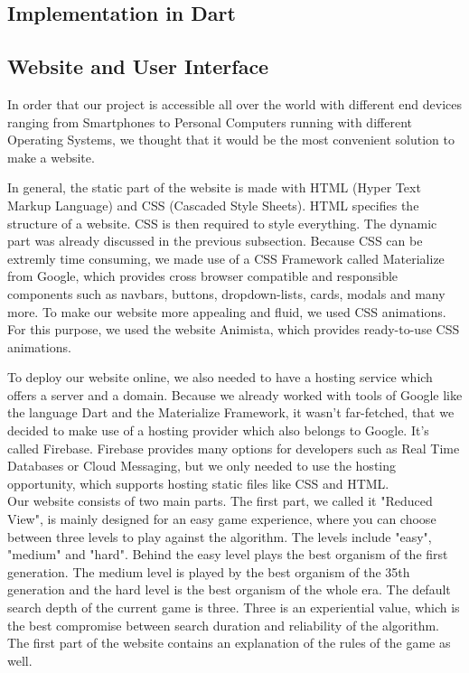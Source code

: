 \subsection{Implementation in Dart}


\subsection{Website and User Interface}
In order that our project is accessible all over the world with different end devices ranging from Smartphones to Personal Computers running with different Operating Systems, we thought that it would be the most convenient solution to make a website. 

In general, the static part of the website is made with HTML (Hyper Text Markup Language) and CSS (Cascaded Style Sheets). HTML specifies the structure of a website.  CSS is then required to style everything. The dynamic part was already discussed in the previous subsection. 
Because CSS can be extremly time consuming, we made use of a CSS Framework called Materialize from Google, which provides cross browser compatible and responsible components such as navbars, buttons, dropdown-lists, cards, modals and many more. To make our website more appealing and fluid, we used CSS animations. For this purpose, we used the website Animista, which provides ready-to-use CSS animations.

To deploy our website online, we also needed to have a hosting service which offers a server and a domain. Because we already worked with tools of Google like the language Dart and the Materialize Framework, it wasn't far-fetched, that we decided to make use of a hosting provider which also belongs to Google. It's called Firebase. Firebase provides many options for developers such as Real Time Databases or Cloud Messaging, but we only needed to use the hosting opportunity, which supports hosting static files like CSS and HTML.\\

Our website consists of two main parts. The first part, we called it "Reduced View", is mainly designed for an easy game experience, where you can choose between three levels to play against the algorithm. The levels include "easy", "medium" and "hard". Behind the easy level plays the best organism of the first generation. 
The medium level is played by the best organism of the 35th %
generation and the hard level is the best organism of the whole era. The default search depth of the current game is three. Three is an experiential value, which is the best compromise between search duration and reliability of the algorithm.
The first part of the website contains an explanation of the rules of the game as well.

